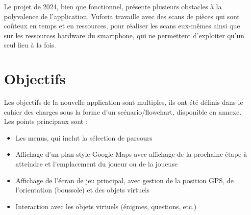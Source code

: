 Le projet de 2024, bien que fonctionnel, présente plusieurs obstacles à la polyvalence de l'application. Vuforia
travaille avec des scans de pièces qui sont coûteux en temps et en ressources, pour réaliser les scans
eux-mêmes ainsi que sur les ressources hardware du smartphone, qui ne permettent d'exploiter qu'un seul lieu
à la fois.

\section{Objectifs}

Les objectifs de la nouvelle application sont multiples, ils ont été définis dans le cahier des charges sous la forme d'un
scénario/flowchart, disponible en annexe. Les points principaux sont :
\begin{itemize}[label=\textbullet]
    \item Les menus, qui inclut la sélection de parcours
    \item Affichage d'un plan style Google Maps avec affichage de la prochaine étape à atteindre et l'emplacement du joueur ou de la joueuse
    \item Affichage de l'écran de jeu principal, avec gestion de la position GPS, de l'orientation (boussole) et des objets virtuels
    \item Interaction avec les objets virtuels (énigmes, questions, etc.)
\end{itemize}




